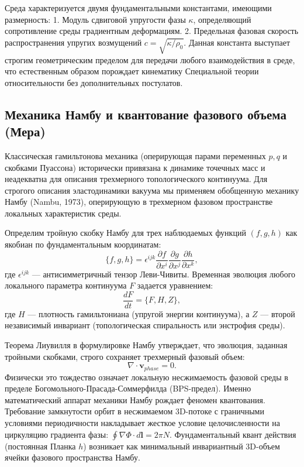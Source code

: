 \documentclass[12pt,a4paper]{article}
\begin{document}
Среда характеризуется двумя фундаментальными константами, имеющими размерность:
1. Модуль сдвиговой упругости фазы $\kappa$, определяющий сопротивление среды градиентным деформациям.
2. Предельная фазовая скорость распространения упругих возмущений $c = \sqrt{\kappa / \rho_0}$. Данная константа выступает строгим геометрическим пределом для передачи любого взаимодействия в среде, что естественным образом порождает кинематику Специальной теории относительности без дополнительных постулатов.

	\subsection{Механика Намбу и квантование фазового объема (Мера)}
Классическая гамильтонова механика (оперирующая парами переменных $p, q$ и скобками Пуассона) исторически привязана к динамике точечных масс и неадекватна для описания трехмерного топологического континуума. Для строгого описания эластодинамики вакуума мы применяем обобщенную механику Намбу (Nambu, 1973), оперирующую в трехмерном фазовом пространстве локальных характеристик среды.

Определим тройную скобку Намбу для трех наблюдаемых функций $(f, g, h)$ как якобиан по фундаментальным координатам:
	\begin{equation}
	\{f, g, h\} = \epsilon^{ijk} \frac{\partial f}{\partial x^i} \frac{\partial g}{\partial x^j} \frac{\partial h}{\partial x^k},
	\end{equation}
где $\epsilon^{ijk}$ — антисимметричный тензор Леви-Чивиты.
Временная эволюция любого локального параметра континуума $F$ задается уравнением:
	\begin{equation}
	\frac{dF}{dt} = \{F, H, Z\},
	\end{equation}
где $H$ — плотность гамильтониана (упругой энергии континуума), а $Z$ — второй независимый инвариант (топологическая спиральность или энстрофия среды). 

Теорема Лиувилля в формулировке Намбу утверждает, что эволюция, заданная тройными скобками, строго сохраняет трехмерный фазовый объем:
	\begin{equation}
	\nabla \cdot \mathbf{v}_{phase} = 0.
	\end{equation}
Физически это тождество означает локальную несжимаемость фазовой среды в пределе Богомольного-Прасада-Соммерфилда (BPS-предел). 
Именно математический аппарат механики Намбу рождает феномен квантования. Требование замкнутости орбит в несжимаемом 3D-потоке с граничными условиями периодичности накладывает жесткое условие целочисленности на циркуляцию градиента фазы: $\oint \nabla \Phi \cdot d\mathbf{l} = 2\pi N$. Фундаментальный квант действия (постоянная Планка $h$) возникает как минимальный инвариантный 3D-объем ячейки фазового пространства Намбу.
\end{document}
